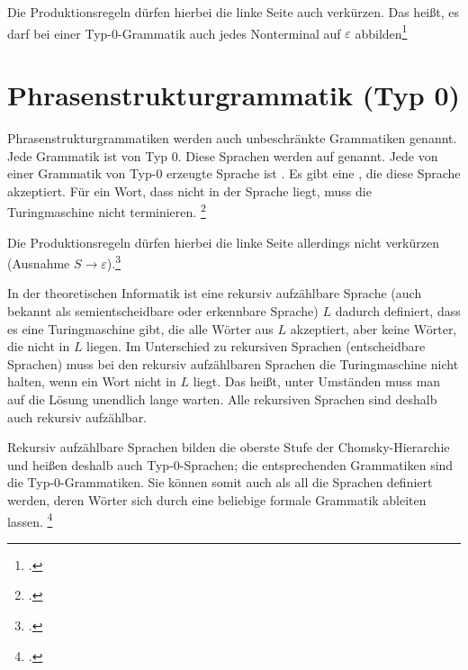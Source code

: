 \documentclass{lehramt-informatik-haupt}
\begin{document}
Die Produktionsregeln dürfen hierbei die linke Seite auch verkürzen. Das
heißt, es darf bei einer Typ-0-Grammatik auch jedes Nonterminal auf
$\varepsilon$ abbilden\footcite[Seite 13-14]{theo:fs:3}

%

\section{Phrasenstrukturgrammatik (Typ 0)}

Phrasenstrukturgrammatiken werden auch unbeschränkte Grammatiken
genannt. Jede Grammatik ist von Typ 0. Diese Sprachen werden auf
 genannt. Jede von einer Grammatik von Typ-0
erzeugte Sprache ist . Es gibt eine
, die diese Sprache akzeptiert. Für ein Wort, dass
nicht in der Sprache liegt, muss die Turingmaschine nicht terminieren.
\footcite[Seite 13-14]{theo:fs:3}
%

Die Produktionsregeln dürfen hierbei die linke Seite allerdings nicht
verkürzen (Ausnahme $S \rightarrow \varepsilon$).\footcite{theo:fs:3}

In der theoretischen Informatik ist eine rekursiv aufzählbare Sprache
(auch bekannt als semientscheidbare oder erkennbare Sprache) $L$ dadurch
definiert, dass es eine Turingmaschine gibt, die alle Wörter aus $L$
akzeptiert, aber keine Wörter, die nicht in $L$ liegen. Im Unterschied
zu rekursiven Sprachen (entscheidbare Sprachen) muss bei den rekursiv
aufzählbaren Sprachen die Turingmaschine nicht halten, wenn ein Wort
nicht in $L$ liegt. Das heißt, unter Umständen muss man auf die Lösung
unendlich lange warten. Alle rekursiven Sprachen sind deshalb auch
rekursiv aufzählbar.

Rekursiv aufzählbare Sprachen bilden die oberste Stufe der
Chomsky-Hierarchie und heißen deshalb auch Typ-0-Sprachen; die
entsprechenden Grammatiken sind die Typ-0-Grammatiken. Sie können somit
auch als all die Sprachen definiert werden, deren Wörter sich durch eine
beliebige formale Grammatik ableiten lassen.
\footcite{wiki:rekursiv-aufzaehlbare-sprache}

\literatur
\end{document}
